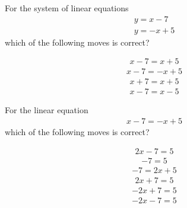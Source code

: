 \documentclass{webquiz}
\begin{document}
\begin{question} %
For the system of linear equations
\begin{gather*} 
y=x-7\\
y=-x+5
\end{gather*}
which of the following moves is correct?
\begin{choice}[columns=2] %
\incorrect
\begin{gather*} 
x-7=x+5
\end{gather*}
\correct
\begin{gather*} 
x-7=-x+5
\end{gather*}
\incorrect
\begin{gather*} 
x+7=x+5
\end{gather*}
\incorrect
\begin{gather*} 
x-7=x-5
\end{gather*}
\end{choice}
\end{question}



\begin{question} %
For the linear equation
\begin{gather*} 
x-7=-x+5
\end{gather*}
which of the following moves is correct?
\begin{choice}[columns=2] %
\correct
\begin{gather*} 
2x-7=5
\end{gather*}
\incorrect
\begin{gather*} 
-7=5
\end{gather*}
\incorrect
\begin{gather*} 
-7=2x+5
\end{gather*}
\incorrect
\begin{gather*} 
2x+7=5
\end{gather*}
\incorrect
\begin{gather*} 
-2x+7=5
\end{gather*}
\incorrect
\begin{gather*} 
-2x-7=5
\end{gather*}
\end{choice}
\end{question}
\end{document}
